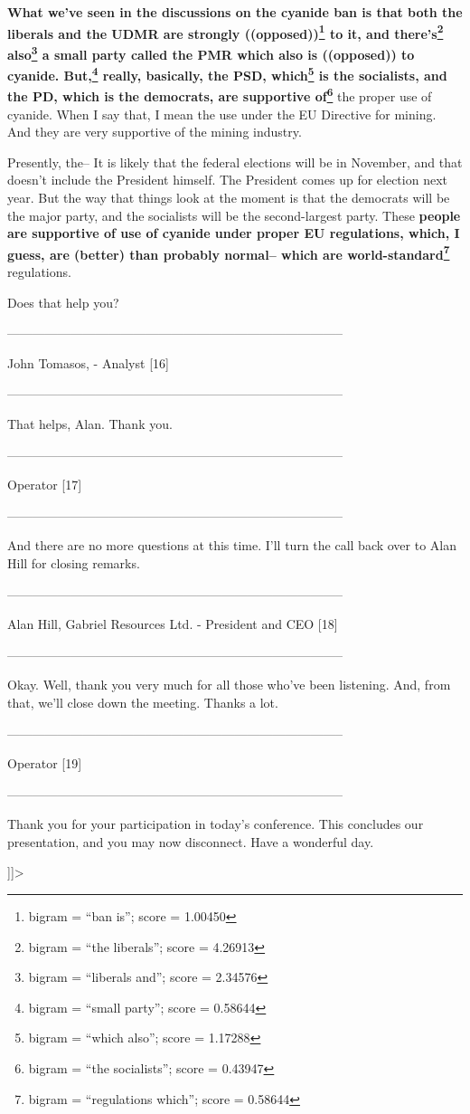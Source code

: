 \documentclass{article}
\begin{document}
 \textbf{What we've seen in the discussions on the cyanide ban is that both the liberals and the UDMR are strongly ((opposed))\footnote{bigram = ``ban is''; score = 1.00450} to it, and there's\footnote{bigram = ``the liberals''; score = 4.26913} also\footnote{bigram = ``liberals and''; score = 2.34576} a small party called the PMR which also is ((opposed)) to cyanide. But,\footnote{bigram = ``small party''; score = 0.58644} really, basically, the PSD, which\footnote{bigram = ``which also''; score = 1.17288} is the socialists, and the PD, which is the democrats, are supportive of\footnote{bigram = ``the socialists''; score = 0.43947}} the proper use of cyanide. When I say that, I mean the use under the EU Directive for mining. And they are very supportive of the mining industry. 

 Presently, the-- It is likely that the federal elections will be in November, and that doesn't include the President himself. The President comes up for election next year. But the way that things look at the moment is that the democrats will be the major party, and the socialists will be the second-largest party. These \textbf{people are supportive of use of cyanide under proper EU regulations, which, I guess, are (better) than probably normal-- which are world-standard\footnote{bigram = ``regulations which''; score = 0.58644}} regulations. 

 Does that help you? 

 -------------------------------------------------------------------------------- 

 John Tomasos, - Analyst [16] 

 -------------------------------------------------------------------------------- 

 That helps, Alan. Thank you. 

 -------------------------------------------------------------------------------- 

 Operator [17] 

 -------------------------------------------------------------------------------- 

 And there are no more questions at this time. I'll turn the call back over to Alan Hill for closing remarks. 

 -------------------------------------------------------------------------------- 

 Alan Hill, Gabriel Resources Ltd. - President and CEO [18] 

 -------------------------------------------------------------------------------- 

 Okay. Well, thank you very much for all those who've been listening. And, from that, we'll close down the meeting. Thanks a lot. 

 -------------------------------------------------------------------------------- 

 Operator [19] 

 -------------------------------------------------------------------------------- 

 Thank you for your participation in today's conference. This concludes our presentation, and you may now disconnect. Have a wonderful day. 

 ]]>
\end{document}
